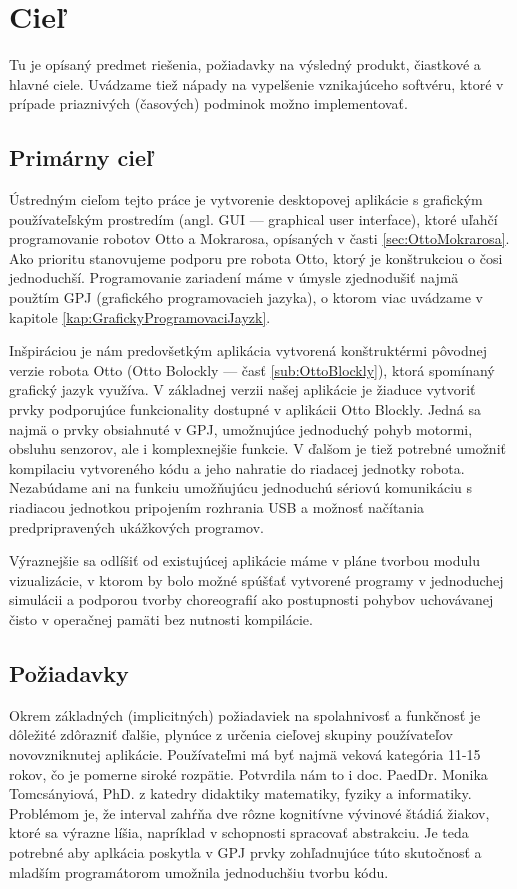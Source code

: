 \chapter{Cieľ}

\label{kap:ciel}

Tu je opísaný predmet riešenia, požiadavky na výsledný produkt, čiastkové a hlavné ciele. Uvádzame tiež nápady na vypelšenie vznikajúceho softvéru, ktoré v prípade priaznivých (časových) podminok možno implementovať.

\section{Primárny cieľ}
Ústredným cieľom tejto práce je vytvorenie desktopovej aplikácie s grafickým používateľským prostredím (angl. GUI --- graphical user interface), ktoré uľahčí programovanie robotov Otto a Mokrarosa, opísaných v časti \ref{sec:OttoMokrarosa}. Ako prioritu stanovujeme podporu pre robota Otto, ktorý je konštrukciou o čosi jednoduchší. Programovanie zariadení máme v úmysle zjednodušiť najmä použtím GPJ (grafického programovacieh jazyka), o ktorom viac uvádzame v kapitole \ref{kap:GrafickyProgramovaciJayzk}.

Inšpiráciou je nám predovšetkým aplikácia vytvorená konštruktérmi pôvodnej verzie robota Otto (Otto Bolockly --- časť \ref{sub:OttoBlockly}), ktorá spomínaný grafický jazyk využíva. V základnej verzii našej aplikácie je žiaduce vytvoriť prvky podporujúce funkcionality dostupné v aplikácii Otto Blockly. Jedná sa najmä o prvky obsiahnuté v GPJ, umožnujúce jednoduchý pohyb motormi, obsluhu senzorov, ale i komplexnejšie funkcie. V ďalšom je tiež potrebné umožniť kompilaciu vytvoreného kódu a jeho nahratie do riadacej jednotky robota. Nezabúdame ani na funkciu umožňujúcu jednoduchú sériovú komunikáciu s riadiacou jednotkou pripojením rozhrania USB a možnosť načítania predpripravených ukážkových programov.

Výraznejšie sa odlíšiť od existujúcej aplikácie máme v pláne tvorbou modulu vizualizácie, v ktorom by bolo možné spúšťať vytvorené programy v jednoduchej simulácii a podporou tvorby choreografií ako postupnosti pohybov uchovávanej čisto v operačnej pamäti bez nutnosti kompilácie.

\section{Požiadavky}
Okrem základných (implicitných) požiadaviek na spolahnivosť a funkčnosť je dôležité zdôrazniť ďalšie, plynúce z určenia cieľovej skupiny používateľov novovzniknutej aplikácie. Používateľmi má byť najmä veková kategória 11-15 rokov, čo je pomerne siroké rozpätie. Potvrdila nám to i doc. PaedDr. Monika Tomcsányiová, PhD. z katedry didaktiky matematiky, fyziky a informatiky. Problémom je, že interval zahŕňa dve rôzne kognitívne vývinové štádiá žiakov, ktoré sa výrazne líšia, napríklad v schopnosti spracovať abstrakciu. Je teda potrebné aby aplkácia poskytla v GPJ prvky zohľadnujúce túto skutočnosť a mladším programátorom umožnila jednoduchšiu tvorbu kódu.

